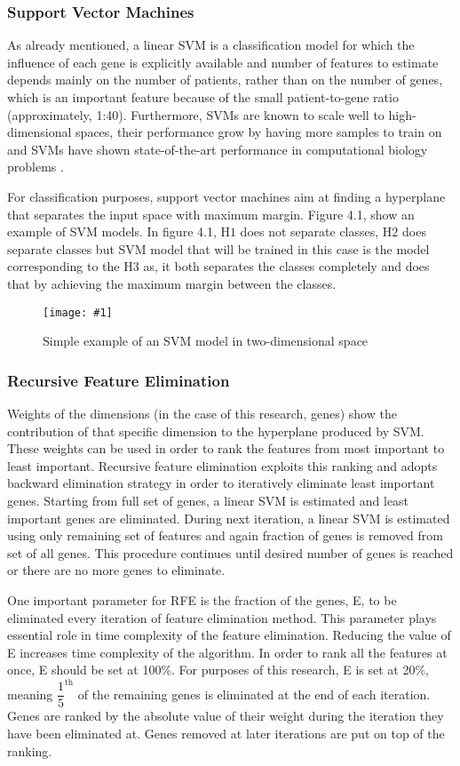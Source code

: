 \documentclass{ba-kecs}
\numberwithin{figure}{section}
\numberwithin{equation}{section}
\newcommand{\dkepic}[2]{ %
	\begin{figure}[H] %
	\texttt{[image: \#1]}
	\caption{#2}
	\label{#1}
	\end{figure}
}
\begin{document}
\subsubsection{Support Vector Machines}

As already mentioned, a linear SVM is a classification model for which the influence of each gene is explicitly available and number of features to estimate depends mainly on the number of patients, rather than on the number of genes, which is an important feature because of the small patient-to-gene ratio (approximately, 1:40). Furthermore, SVMs are known to scale well to high-dimensional spaces, their performance grow by having more samples to train on and SVMs have shown state-of-the-art performance in computational biology problems \cite{benhur}.

For classification purposes, support vector machines aim at finding a hyperplane that separates the input space with maximum margin. Figure 4.1, show an example of SVM models. In figure 4.1, $\mathrm{H1}$ does not separate classes, $\mathrm{H2}$ does separate classes but SVM model that will be trained in this case is the model corresponding to the $\mathrm{H3}$ as, it both separates the classes completely and does that by achieving the maximum margin between the classes.
\dkepic{SVM}{Simple example of an SVM model in two-dimensional space}

\subsubsection{Recursive Feature Elimination}

Weights of the dimensions (in the case of this research, genes) show the contribution of that specific dimension to the hyperplane produced by SVM. These weights can be used in order to rank the features from most important to least important. Recursive feature elimination exploits this ranking and adopts backward elimination strategy in order to iteratively eliminate least important genes. Starting from full set of genes, a linear SVM is estimated and least important genes are eliminated. During next iteration, a linear SVM is estimated using only remaining set of features and again fraction of genes is removed from set of all genes. This procedure continues until desired number of genes is reached or there are no more genes to eliminate. 

One important parameter for RFE is the fraction of the genes, E, to be eliminated every iteration of feature elimination method. This parameter plays essential role in time complexity of the feature elimination. Reducing the value of E increases time complexity of the algorithm. In order to rank all the features at once, E should be set at 100\%. For purposes of this research, E is set at 20\%, meaning $\dfrac{1}{5}^{\mathrm{th}}$ of the remaining genes is eliminated at the end of each iteration. Genes are ranked by the absolute value of their weight during the iteration they have been eliminated at. Genes removed at later iterations are put on top of the ranking.
\end{document}
